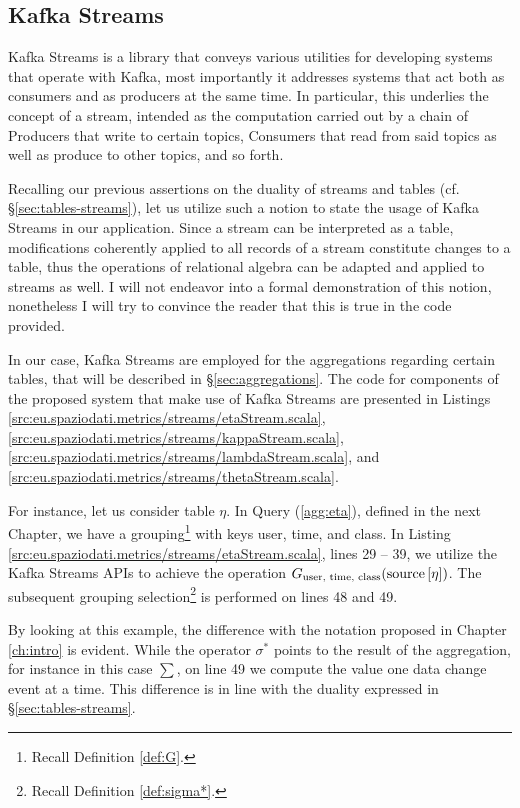 \subsection{Kafka Streams}
\label{sec:kafka-streams}

Kafka Streams is a library that conveys various utilities for developing systems that operate with Kafka, most importantly it addresses systems that act both as consumers and as producers at the same time.
In particular, this underlies the concept of a stream, intended as the computation carried out by a chain of Producers that write to certain topics, Consumers that read from said topics as well as produce to other topics, and so forth.

Recalling our previous assertions on the duality of streams and tables (cf. \S \ref{sec:tables-streams}), let us utilize such a notion to state the usage of Kafka Streams in our application.
Since a stream can be interpreted as a table, modifications coherently applied to all records of a stream constitute changes to a table, thus the operations of relational algebra can be adapted and applied to streams as well.
I will not endeavor into a formal demonstration of this notion, nonetheless I will try to convince the reader that this is true in the code provided.

In our case, Kafka Streams are employed for the aggregations regarding certain tables, that will be described in \S \ref{sec:aggregations}.
The code for components of the proposed system that make use of Kafka Streams are presented in Listings \ref{src:eu.spaziodati.metrics/streams/etaStream.scala}, \ref{src:eu.spaziodati.metrics/streams/kappaStream.scala},
\ref{src:eu.spaziodati.metrics/streams/lambdaStream.scala}, and
\ref{src:eu.spaziodati.metrics/streams/thetaStream.scala}.

For instance, let us consider table $\eta$. In Query (\ref{agg:eta}), defined in the next Chapter, we have a grouping\footnote{%
	Recall Definition \ref{def:G}.
} with keys user, time, and class. In Listing \ref{src:eu.spaziodati.metrics/streams/etaStream.scala}, lines 29 -- 39, we utilize the Kafka Streams APIs to achieve the operation $G_{\text{user, time, class}}(\text{source}\left[{\eta}\right])$.
The subsequent grouping selection\footnote{%
	Recall Definition \ref{def:sigma*}.
} is performed on lines 48 and 49.

By looking at this example, the difference with the notation proposed in Chapter \ref{ch:intro} is evident.
While the operator $\sigma^*$ points to the result of the aggregation, for instance in this case $\sum$, on line 49 we compute the value one data change event at a time.
This difference is in line with the duality expressed in \S \ref{sec:tables-streams}.


